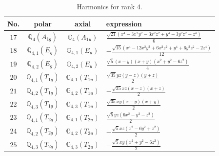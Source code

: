 \documentclass[fleqn,8pt,landscape]{jsarticle}
\begin{document}
\begin{table}[ht!]
\begin{center}
\caption{Harmonics for rank 4.}
\renewcommand{\arraystretch}{1.3}
\begin{tabular}{cccl} \hline \hline
No. & polar & axial & expression \\ \hline
$ 17 $ & $ \mathbb{Q}_{4}(A_{1g}) $ & $ \mathbb{G}_{4}(A_{1u}) $ & $ \frac{\sqrt{21} \left(x^{4} - 3 x^{2} y^{2} - 3 x^{2} z^{2} + y^{4} - 3 y^{2} z^{2} + z^{4}\right)}{6} $ \\
$ 18 $ & $ \mathbb{Q}_{4,1}(E_{g}) $ & $ \mathbb{G}_{4,1}(E_{u}) $ & $ - \frac{\sqrt{15} \left(x^{4} - 12 x^{2} y^{2} + 6 x^{2} z^{2} + y^{4} + 6 y^{2} z^{2} - 2 z^{4}\right)}{12} $ \\
$ 19 $ & $ \mathbb{Q}_{4,2}(E_{g}) $ & $ \mathbb{G}_{4,2}(E_{u}) $ & $ \frac{\sqrt{5} \left(x - y\right) \left(x + y\right) \left(x^{2} + y^{2} - 6 z^{2}\right)}{4} $ \\
$ 20 $ & $ \mathbb{Q}_{4,1}(T_{1g}) $ & $ \mathbb{G}_{4,1}(T_{1u}) $ & $ \frac{\sqrt{35} y z \left(y - z\right) \left(y + z\right)}{2} $ \\
$ 21 $ & $ \mathbb{Q}_{4,2}(T_{1g}) $ & $ \mathbb{G}_{4,2}(T_{1u}) $ & $ - \frac{\sqrt{35} x z \left(x - z\right) \left(x + z\right)}{2} $ \\
$ 22 $ & $ \mathbb{Q}_{4,3}(T_{1g}) $ & $ \mathbb{G}_{4,3}(T_{1u}) $ & $ \frac{\sqrt{35} x y \left(x - y\right) \left(x + y\right)}{2} $ \\
$ 23 $ & $ \mathbb{Q}_{4,1}(T_{2g}) $ & $ \mathbb{G}_{4,1}(T_{2u}) $ & $ \frac{\sqrt{5} y z \left(6 x^{2} - y^{2} - z^{2}\right)}{2} $ \\
$ 24 $ & $ \mathbb{Q}_{4,2}(T_{2g}) $ & $ \mathbb{G}_{4,2}(T_{2u}) $ & $ - \frac{\sqrt{5} x z \left(x^{2} - 6 y^{2} + z^{2}\right)}{2} $ \\
$ 25 $ & $ \mathbb{Q}_{4,3}(T_{2g}) $ & $ \mathbb{G}_{4,3}(T_{2u}) $ & $ - \frac{\sqrt{5} x y \left(x^{2} + y^{2} - 6 z^{2}\right)}{2} $ \\
 \hline \hline
\end{tabular}
\end{center}
\end{table}
\end{document}
